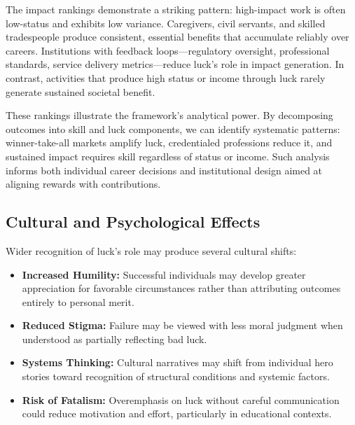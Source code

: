   The impact rankings demonstrate a striking pattern: high-impact work
  is often low-status and exhibits low variance. Caregivers, civil servants,
  and skilled tradespeople produce consistent, essential benefits that
  accumulate reliably over careers. Institutions with feedback loops—regulatory
  oversight, professional standards, service delivery metrics—reduce luck's
  role in impact generation. In contrast, activities that produce high
  status or income through luck rarely generate sustained societal benefit.

  These rankings illustrate the framework's analytical power. By decomposing
  outcomes into skill and luck components, we can identify systematic
  patterns: winner-take-all markets amplify luck, credentialed professions
  reduce it, and sustained impact requires skill regardless of status
  or income. Such analysis informs both individual career decisions and
  institutional design aimed at aligning rewards with contributions.

  \subsection{Cultural and Psychological Effects}

  Wider recognition of luck's role may produce several cultural shifts:

  \begin{itemize}
    \item \textbf{Increased Humility:} Successful individuals may
      develop greater appreciation for favorable circumstances rather
      than attributing outcomes entirely to personal merit.

    \item \textbf{Reduced Stigma:} Failure may be viewed with less moral
      judgment when understood as partially reflecting bad luck.

    \item \textbf{Systems Thinking:} Cultural narratives may shift from
      individual hero stories toward recognition of structural
      conditions and systemic factors.

    \item \textbf{Risk of Fatalism:} Overemphasis on luck without
      careful communication could reduce motivation and effort, particularly
      in educational contexts.
  \end{itemize}

